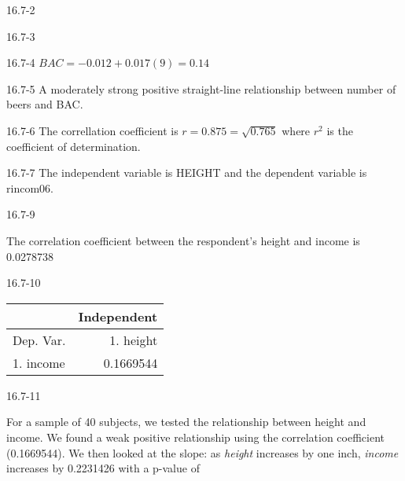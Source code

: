 \begin{exsol@solution}{16.7-2}
\end{exsol@solution}
\begin{exsol@solution}{16.7-3}

\end{exsol@solution}
\begin{exsol@solution}{16.7-4}
     $ BAC = -0.012 + 0.017 (9) = 0.14 $
\end{exsol@solution}
\begin{exsol@solution}{16.7-5}
    A moderately strong positive straight-line relationship between number of beers and BAC.
\end{exsol@solution}
\begin{exsol@solution}{16.7-6}
       The correllation coefficient is $r = 0.875 = \sqrt{0.765}$ where  $r^2$ is the coefficient of determination.
\end{exsol@solution}
\begin{exsol@solution}{16.7-7}
       The independent variable is HEIGHT and the dependent variable is rincom06.
\end{exsol@solution}
\begin{exsol@solution}{16.7-9}

       The correlation coefficient between the respondent's height and income is 0.0278738

\end{exsol@solution}
\begin{exsol@solution}{16.7-10}

       \begin{table}[ht]
    \centering
    \begin{tabular}{lr} \hline
        &  \multicolumn{1}{c}{Independent} \\ \hline

    Dep. Var. & 1. height      \\ \hline
    1. income  &   0.1669544      \\ \hline

    \end{tabular}
    \end{table}


\end{exsol@solution}
\begin{exsol@solution}{16.7-11}

    For a sample of 40 subjects, we tested the relationship between height and income.  We found a weak positive relationship using the correlation coefficient (0.1669544).  We then looked at the slope:  as {\textit{height}} increases by one inch, {\textit{income}} increases by 0.2231426 with a p-value of


\end{exsol@solution}

